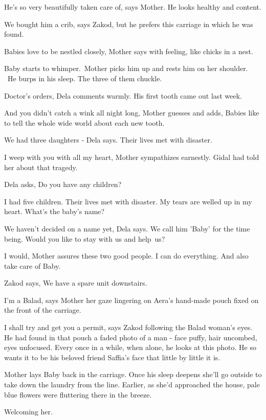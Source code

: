 \documentclass[letterpaper]{article}
\begin{document}
{\textquotedbl}He's so very beautifully taken care of,{\textquotedbl} says Mother. {\textquotedbl}He looks healthy and
content.{\textquotedbl} 

{\textquotedbl}We bought him a crib,{\textquotedbl} says Zakod, {\textquotedbl}but he prefers this carriage in which he
was found.{\textquotedbl}

{\textquotedbl}Babies love to be nestled closely,{\textquotedbl} Mother says with feeling, {\textquotedbl}like chicks in
a nest.{\textquotedbl} 

Baby starts to whimper.\ Mother picks him up and rests him on her shoulder. ~He burps in his sleep. The three of them
chuckle. 

{\textquotedbl}Doctor's orders,{\textquotedbl} Dela comments warmly. {\textquotedbl}His first tooth came out last
week.{\textquotedbl}~ 

{\textquotedbl}And you didn't catch a wink all night long,{\textquotedbl} Mother guesses and adds, {\textquotedbl}Babies
like to tell the whole wide world about each new tooth.{\textquotedbl} 

{\textquotedbl}We had three daughters -{\textquotedbl} Dela says. {\textquotedbl}Their lives met with
disaster.{\textquotedbl} 

{\textquotedbl}I weep with you with all my heart,{\textquotedbl} Mother sympathizes earnestly. Gidal had told her about
that tragedy. 

Dela asks, {\textquotedbl}Do you have any children?{\textquotedbl} 

{\textquotedbl}I had five children. Their lives met with disaster. My tears are welled up in my heart. What's the baby's
name?{\textquotedbl} 

{\textquotedbl}We haven't decided on a name yet,{\textquotedbl} Dela says. {\textquotedbl}We call him 'Baby' for the
time being. Would you like to stay with us and help~us?{\textquotedbl} 

{\textquotedbl}I would,{\textquotedbl} Mother assures these two good people. {\textquotedbl}I can do everything. And
also take care of Baby.{\textquotedbl} 

Zakod says, {\textquotedbl}We have a spare unit downstairs.{\textquotedbl} 

{\textquotedbl}I'm a Balad,{\textquotedbl} says Mother her gaze lingering on Aera's hand-made pouch fixed on the front
of the carriage. 

{\textquotedbl}I shall try and get you a permit,{\textquotedbl} says Zakod following the Balad woman's eyes. He had
found in that pouch a faded photo of a man - face puffy, hair uncombed, eyes unfocused. Every once in a while, when
alone, he looks at this photo. He so wants it to be his beloved friend Saffia's face that little by little it is. 

Mother lays Baby back in the carriage. Once his sleep deepens she'll go outside to take down the laundry from the line.
Earlier, as she'd approached the house, pale blue flowers were fluttering there in the breeze. 

Welcoming her.


\bigskip
\end{document}
